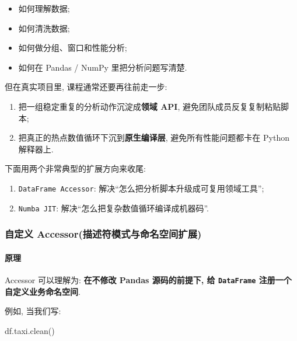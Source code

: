 \documentclass[11pt]{article}
\providecommand{\tightlist}{%
      \setlength{\itemsep}{0pt}\setlength{\parskip}{0pt}}
\newenvironment{Shaded}{}{}
\newcommand{\NormalTok}[1]{{#1}}
\begin{document}
\begin{itemize}
\tightlist
\item
  如何理解数据;\\
\item
  如何清洗数据;\\
\item
  如何做分组、窗口和性能分析;\\
\item
  如何在 Pandas / NumPy 里把分析问题写清楚.
\end{itemize}

但在真实项目里, 课程通常还要再往前走一步:

\begin{enumerate}
\def\labelenumi{\arabic{enumi}.}
\tightlist
\item
  把一组稳定重复的分析动作沉淀成\textbf{领域 API},
  避免团队成员反复复制粘贴脚本;
\item
  把真正的热点数值循环下沉到\textbf{原生编译层}, 避免所有性能问题都卡在
  Python 解释器上.
\end{enumerate}

下面用两个非常典型的扩展方向来收尾:

\begin{enumerate}
\def\labelenumi{\arabic{enumi}.}
\tightlist
\item
  \texttt{DataFrame\ Accessor}:
  解决``怎么把分析脚本升级成可复用领域工具'';
\item
  \texttt{Numba\ JIT}: 解决``怎么把复杂数值循环编译成机器码''.
\end{enumerate}

    \subsubsection{自定义
Accessor(描述符模式与命名空间扩展)}\label{ux81eaux5b9aux4e49-accessorux63cfux8ff0ux7b26ux6a21ux5f0fux4e0eux547dux540dux7a7aux95f4ux6269ux5c55}

    \paragraph{原理}\label{ux539fux7406}

    Accessor 可以理解为: \textbf{在不修改 Pandas 源码的前提下, 给
\texttt{DataFrame} 注册一个自定义业务命名空间}.

例如, 当我们写:

\begin{Shaded}
\begin{Highlighting}[]
\NormalTok{df.taxi.clean()}
\end{Highlighting}
\end{Shaded}
\end{document}
